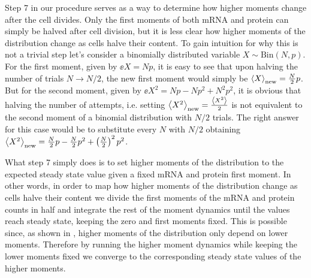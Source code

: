 Step 7 in our procedure serves as a way to determine how higher moments change
after the cell divides. Only the first moments of both mRNA and protein can
simply be halved after cell division, but it is less clear how higher moments of
the distribution change as cells halve their content. To gain intuition for why
this is not a trivial step let's consider a binomially distributed variable $X
\sim \text{Bin}(N, p)$. For the first moment, given by $\ee{X} = Np$, it is easy
to see that upon halving the number of trials $N \rightarrow N/2$, the new first
moment would simply be $\left\langle X \right\rangle_{\text{new}} = {N \over 2} p$. But for the second
moment, given by $\ee{X^2} = Np - Np^2 + N^2p^2$, it is obvious that halving the
number of attempts, i.e. setting $\left\langle X^2 \right\rangle_{\text{new}} = {\left\langle X^2 \right\rangle \over 2}$ is
not equivalent to the second moment of a binomial distribution with $N/2$
trials. The right answer for this case would be to substitute every $N$ with
$N/2$ obtaining $\left\langle X^2 \right\rangle_{\text{new}} = {N \over 2}p - {N \over 2}p^2 +
\left({N \over 2}\right)^2p^2$.

What step 7 simply does is to set higher moments of the distribution to the
expected steady state value given a fixed mRNA and protein first moment. In
other words, in order to map how higher moments of the distribution change as
cells halve their content we divide the first moments of the mRNA and protein
counts in half and integrate the rest of the moment dynamics until the values
reach steady state, keeping the zero and first moments fixed. This is possible
since, as shown in , higher moments of the distribution only
depend on lower moments. Therefore by running the higher moment dynamics while
keeping the lower moments fixed we converge to the corresponding steady state
values of the higher moments.

